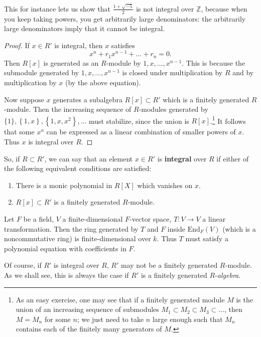 This for instance lets us show that $\frac{1+\sqrt{-5}}{2}$ is not integral
over $\mathbb{Z}$, because when you keep taking powers, you get arbitrarily
large denominators: the arbitrarily large denominators imply that it cannot be
integral.

\begin{proof}
If $x  \in R'$ is integral, then $x$ satisfies
\[ x^n + r_1 x^{n-1}+\dots+r_n = 0.  \]
Then $R[x]$ is generated as an $R$-module by $1, x, \dots, x^{n-1}$.  This is
because the submodule generated by $1, x ,\dots, x^{n-1}$ is closed under
multiplication by $R$ and by multiplication by $x$ (by the above equation).

Now suppose $x$ generates a subalgebra $R[x] \subset R'$ which is a finitely
generated $R$-module.  Then the increasing sequence
of $R$-modules generated by $\{1\}, \left\{1, x\right\}, \left\{1, x,
x^2\right\}
, \dots$ must stabilize, since the union is $R[x]$.\footnote{As an easy
exercise, one may see that if a finitely generated module $M$ is the union of
an increasing sequence of submodules $M_1 \subset M_2 \subset M_3 \subset
\dots$, then $M  = M_n$ for some $n$; we just need to take $n$ large enough
such that $M_n$ contains each of the finitely many generators of $M$.}  It follows that some $x^n$
can be expressed as a linear combination of smaller powers of $x$. Thus $x$ is
integral over $R$.
\end{proof}

So, if $R \subset R'$, we can say that
an element $x \in R'$ is \textbf{integral} over $R$ if either of the following
equivalent conditions are satisfied:

\begin{enumerate}
\item There is a monic polynomial in $R[X]$ which vanishes on $x$.
\item $R[x] \subset R'$ is a finitely generated $R$-module.
\end{enumerate}

\begin{example}
Let $F$ be a field, $V$ a finite-dimensional $F$-vector space, $T: V \to V$ a
linear transformation. Then the ring generated by $T$ and $F$ inside
$\mathrm{End}_F(V)$ (which is a noncommutative ring) is finite-dimensional
over $k$.
Thus $T$ must satisfy a polynomial equation with coefficients in $F$.
\end{example}

Of course, if $R'$ is integral over $R$, $R'$ may not be a finitely generated
$R$-module. As we shall see, this is always the case if $R'$ is a finitely
generated $R$-\emph{algebra}.

